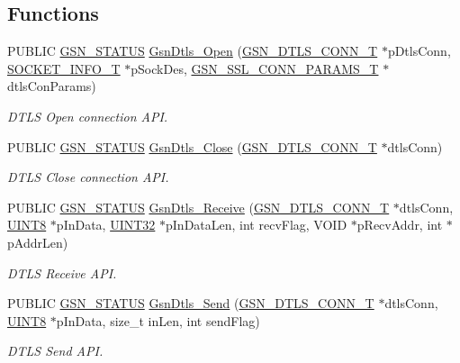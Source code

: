 \subsection*{Functions}
\begin{DoxyCompactItemize}
\item 
PUBLIC \hyperlink{a00660_gada5951904ac6110b1fa95e51a9ddc217}{GSN\_\-STATUS} \hyperlink{a00487_a4b80534a49bac971da7b857cbb860a79}{GsnDtls\_\-Open} (\hyperlink{a00057}{GSN\_\-DTLS\_\-CONN\_\-T} $\ast$pDtlsConn, \hyperlink{a00460}{SOCKET\_\-INFO\_\-T} $\ast$pSockDes, \hyperlink{a00242}{GSN\_\-SSL\_\-CONN\_\-PARAMS\_\-T} $\ast$dtlsConParams)
\begin{DoxyCompactList}\small\item\em DTLS Open connection API. \end{DoxyCompactList}\item 
PUBLIC \hyperlink{a00660_gada5951904ac6110b1fa95e51a9ddc217}{GSN\_\-STATUS} \hyperlink{a00487_a053c8f25766c5ce72505e0afc318918f}{GsnDtls\_\-Close} (\hyperlink{a00057}{GSN\_\-DTLS\_\-CONN\_\-T} $\ast$dtlsConn)
\begin{DoxyCompactList}\small\item\em DTLS Close connection API. \end{DoxyCompactList}\item 
PUBLIC \hyperlink{a00660_gada5951904ac6110b1fa95e51a9ddc217}{GSN\_\-STATUS} \hyperlink{a00487_a79e3c8e7498aeecbf59cf946afc6818c}{GsnDtls\_\-Receive} (\hyperlink{a00057}{GSN\_\-DTLS\_\-CONN\_\-T} $\ast$dtlsConn, \hyperlink{a00660_gab27e9918b538ce9d8ca692479b375b6a}{UINT8} $\ast$pInData, \hyperlink{a00660_gae1e6edbbc26d6fbc71a90190d0266018}{UINT32} $\ast$pInDataLen, int recvFlag, VOID $\ast$pRecvAddr, int $\ast$pAddrLen)
\begin{DoxyCompactList}\small\item\em DTLS Receive API. \end{DoxyCompactList}\item 
PUBLIC \hyperlink{a00660_gada5951904ac6110b1fa95e51a9ddc217}{GSN\_\-STATUS} \hyperlink{a00487_a3e2664c021f4da0a87318641bff2ffb3}{GsnDtls\_\-Send} (\hyperlink{a00057}{GSN\_\-DTLS\_\-CONN\_\-T} $\ast$dtlsConn, \hyperlink{a00660_gab27e9918b538ce9d8ca692479b375b6a}{UINT8} $\ast$pInData, size\_\-t inLen, int sendFlag)
\begin{DoxyCompactList}\small\item\em DTLS Send API. \end{DoxyCompactList}\end{DoxyCompactItemize}


